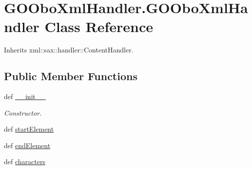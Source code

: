 \hypertarget{class_g_o_obo_xml_handler_1_1_g_o_obo_xml_handler}{
\section{GOOboXmlHandler.GOOboXmlHandler Class Reference}
\label{class_g_o_obo_xml_handler_1_1_g_o_obo_xml_handler}
}


Inherits xml::sax::handler::ContentHandler.

\subsection*{Public Member Functions}
\begin{DoxyCompactItemize}
\item 
def \hyperlink{class_g_o_obo_xml_handler_1_1_g_o_obo_xml_handler_a8317674e5f4b100aabbe53ddf368bb26}{\_\-\_\-init\_\-\_\-}
\begin{DoxyCompactList}\small\item\em Constructor. \item\end{DoxyCompactList}\item 
def \hyperlink{class_g_o_obo_xml_handler_1_1_g_o_obo_xml_handler_acf717862e0d74ded0ba251edf98d52af}{startElement}
\item 
def \hyperlink{class_g_o_obo_xml_handler_1_1_g_o_obo_xml_handler_ab7da652c8f67bc009e89925f40c4a3dd}{endElement}
\item 
def \hyperlink{class_g_o_obo_xml_handler_1_1_g_o_obo_xml_handler_a46b9cda18213754ee2a48ed5a480324d}{characters}
\end{DoxyCompactItemize}
